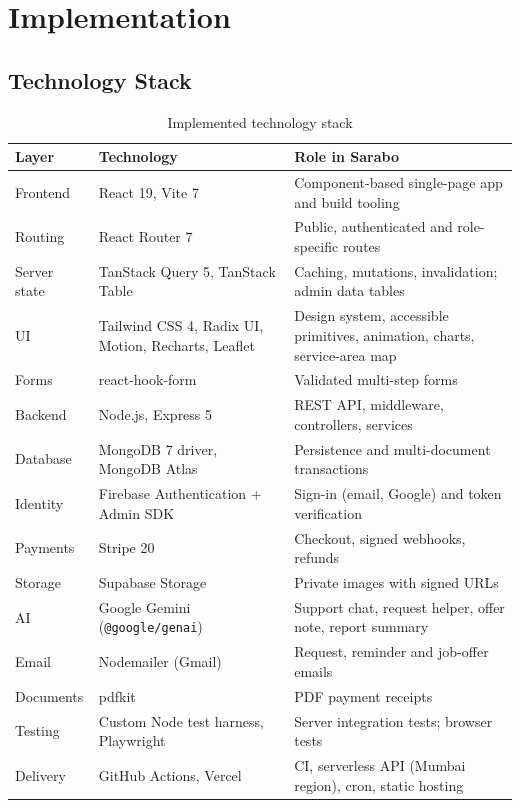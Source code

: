 \documentclass{standalone}
\begin{document}
\chapter{Implementation}

\section{Technology Stack}
\begin{table}[htbp]
\centering
\caption{Implemented technology stack}
\label{tab:stack}
\small
\begin{tabularx}{\textwidth}{@{}p{2.6cm}p{4.4cm}X@{}}
\toprule
\textbf{Layer} & \textbf{Technology} & \textbf{Role in Sarabo} \\
\midrule
Frontend & React 19, Vite 7 & Component-based single-page app and build tooling \\
Routing & React Router 7 & Public, authenticated and role-specific routes \\
Server state & TanStack Query 5, TanStack Table & Caching, mutations, invalidation; admin data tables \\
UI & Tailwind CSS 4, Radix UI, Motion, Recharts, Leaflet & Design system, accessible primitives, animation, charts, service-area map \\
Forms & react-hook-form & Validated multi-step forms \\
Backend & Node.js, Express 5 & REST API, middleware, controllers, services \\
Database & MongoDB 7 driver, MongoDB Atlas & Persistence and multi-document transactions \\
Identity & Firebase Authentication + Admin SDK & Sign-in (email, Google) and token verification \\
Payments & Stripe 20 & Checkout, signed webhooks, refunds \\
Storage & Supabase Storage & Private images with signed URLs \\
AI & Google Gemini (\texttt{@google/genai}) & Support chat, request helper, offer note, report summary \\
Email & Nodemailer (Gmail) & Request, reminder and job-offer emails \\
Documents & pdfkit & PDF payment receipts \\
Testing & Custom Node test harness, Playwright & Server integration tests; browser tests \\
Delivery & GitHub Actions, Vercel & CI, serverless API (Mumbai region), cron, static hosting \\
\bottomrule
\end{tabularx}
\end{table}
\end{document}
